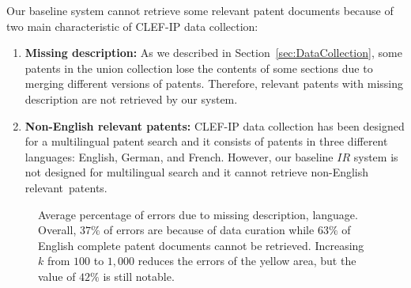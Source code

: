 Our baseline system cannot retrieve some relevant patent documents because of two main characteristic of CLEF-IP data collection: 
\begin{enumerate}

\item \textbf{Missing description: } As we described in Section~\ref{sec:DataCollection}, some patents in the union collection lose the contents of some sections due to merging different versions of patents. Therefore, relevant patents with missing description are not retrieved by our system.
\item \textbf{Non-English relevant patents: } CLEF-IP data collection has been designed for a multilingual patent search and it consists of patents in three different languages: English, German, and French. However, our baseline $\mathit{IR}$ system is not designed for multilingual search and it cannot retrieve non-English relevant~patents.   
\end{enumerate}
\begin{figure}[t!]
\begin{centering}
\par\end{centering} 
\protect\caption{Average percentage of errors due to missing description, language. Overall, $37\%$ of errors are because of data curation while $63\%$ of English complete patent documents cannot be retrieved. Increasing $k$ from $100$ to $1,000$ reduces the errors of the yellow area, but the value of $42\%$ is still notable.}
\label{fig:datacuration}
\end{figure}
